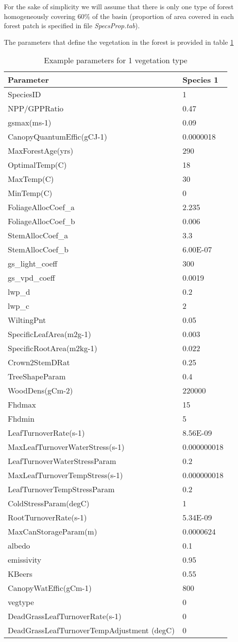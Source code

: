 For the sake of simplicity we will assume that there is only one type of forest homogeneously covering 60\% of the basin (proportion of area covered in each forest patch is specified in file \textit{SpecsProp.tab}). 

The parameters that define the vegetation in the forest is provided in table \ref{tab:exspecpars}

\begin{longtable}{|p{6.5cm}| l|}			
\caption{Example parameters for 1 vegetation type}			
\label{tab:exspecpars}\\			
\hline			
Parameter	&	Species 1	\\
\hline			
SpeciesID	&	1	\\
NPP/GPPRatio	&	0.47	\\
gsmax(ms-1)	&	0.09	\\
CanopyQuantumEffic(gCJ-1)	&	0.0000018	\\
MaxForestAge(yrs)	&	290	\\
OptimalTemp(C)	&	18	\\
MaxTemp(C)	&	30	\\
MinTemp(C)	&	0	\\
FoliageAllocCoef\_a	&	2.235	\\
FoliageAllocCoef\_b	&	0.006	\\
StemAllocCoef\_a	&	3.3	\\
StemAllocCoef\_b	&	6.00E-07	\\
gs\_light\_coeff	&	300	\\
gs\_vpd\_coeff	&	0.0019	\\
lwp\_d	&	0.2	\\
lwp\_c 	&	2	\\
WiltingPnt	&	0.05	\\
SpecificLeafArea(m2g-1)	&	0.003	\\
SpecificRootArea(m2kg-1)	&	0.022	\\
Crown2StemDRat	&	0.25	\\
TreeShapeParam	&	0.4	\\
WoodDens(gCm-2)	&	220000	\\
Fhdmax	&	15	\\
Fhdmin	&	5	\\
LeafTurnoverRate(s-1)	&	8.56E-09	\\
MaxLeafTurnoverWaterStress(s-1)	&	0.000000018	\\
LeafTurnoverWaterStressParam	&	0.2	\\
MaxLeafTurnoverTempStress(s-1)	&	0.000000018	\\
LeafTurnoverTempStressParam	&	0.2	\\
ColdStressParam(degC)	&	1	\\
RootTurnoverRate(s-1)	&	5.34E-09	\\
MaxCanStorageParam(m)	&	0.0000624	\\
albedo	&	0.1	\\
emissivity	&	0.95	\\
KBeers	&	0.55	\\
CanopyWatEffic(gCm-1)	&	800	\\
vegtype	&	0	\\
DeadGrassLeafTurnoverRate(s-1)	&	0	\\
DeadGrassLeafTurnoverTempAdjustment (degC)	&	0	
\end{longtable}			

